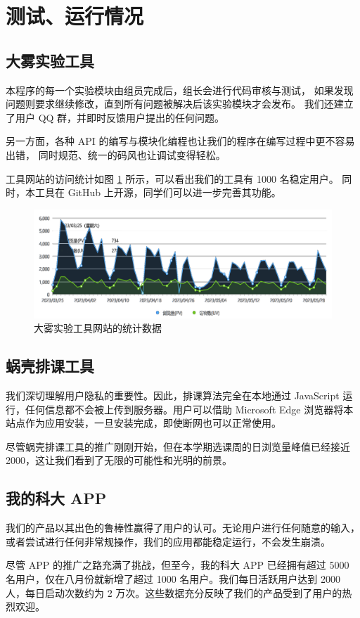 \section{测试、运行情况}

\subsection{大雾实验工具}

本程序的每一个实验模块由组员完成后，组长会进行代码审核与测试，
如果发现问题则要求继续修改，直到所有问题被解决后该实验模块才会发布。
我们还建立了用户 QQ 群，并即时反馈用户提出的任何问题。

另一方面，各种 API 的编写与模块化编程也让我们的程序在编写过程中更不容易出错，
同时规范、统一的码风也让调试变得轻松。


工具网站的访问统计如图 \ref{fig:2} 所示，可以看出我们的工具有 1000 名稳定用户。
同时，本工具在 GitHub 上开源，同学们可以进一步完善其功能。

\begin{figure}[htbp]
  \centering
  \includegraphics[width=\columnwidth]{figure/2.png}
  \caption{大雾实验工具网站的统计数据}
  \label{fig:2}
\end{figure}

\subsection{蜗壳排课工具}

我们深切理解用户隐私的重要性。因此，排课算法完全在本地通过 JavaScript 运行，任何信息都不会被上传到服务器。用户可以借助 Microsoft Edge 浏览器将本站点作为应用安装，一旦安装完成，即使断网也可以正常使用。

尽管蜗壳排课工具的推广刚刚开始，但在本学期选课周的日浏览量峰值已经接近 2000，这让我们看到了无限的可能性和光明的前景。

\subsection{我的科大 APP}

我们的产品以其出色的鲁棒性赢得了用户的认可。无论用户进行任何随意的输入，或者尝试进行任何非常规操作，我们的应用都能稳定运行，不会发生崩溃。

尽管 APP 的推广之路充满了挑战，但至今，我的科大 APP 已经拥有超过 5000 名用户，仅在八月份就新增了超过 1000 名用户。我们每日活跃用户达到 2000 人，每日启动次数约为 2 万次。这些数据充分反映了我们的产品受到了用户的热烈欢迎。